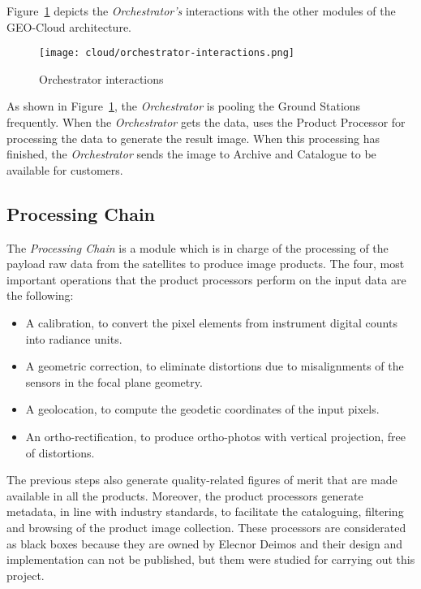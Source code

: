 Figure~\ref{fig:orchestrator-interactions} depicts the \emph{Orchestrator’s} interactions with the other modules of the GEO-Cloud architecture.


\begin{figure}[!h]
\begin{center}
\texttt{[image: cloud/orchestrator-interactions.png]}
\caption{Orchestrator interactions}
\label{fig:orchestrator-interactions}
\end{center}
\end{figure}


As shown in Figure~\ref{fig:orchestrator-interactions}, the \emph{Orchestrator} is
pooling the Ground Stations frequently. When the \emph{Orchestrator} gets the data,
uses the Product Processor for processing the data to generate the result
image. When this processing has finished, the \emph{Orchestrator} sends the image to
Archive and Catalogue to be available for customers.



\subsection{Processing Chain}


The \emph{Processing Chain} is a module which is in charge of the processing of the
payload raw data from the satellites to produce image products. The four, most
important operations that the product processors perform on the input data are
the following:
\begin{itemize}
\item A calibration, to convert the pixel elements from instrument digital counts into radiance units.
\item A geometric correction, to eliminate distortions due to misalignments of the sensors in the focal plane geometry.
\item A geolocation, to compute the geodetic coordinates of the input pixels.
\item An ortho-rectification, to produce ortho-photos with vertical projection, free of distortions.
\end{itemize}

The previous steps also generate quality-related figures of merit that are made
available in all the products. Moreover, the product processors generate
metadata, in line with industry standards, to facilitate the cataloguing,
filtering and browsing of the product image collection. These processors are
considerated as black boxes because they are owned by Elecnor Deimos and their
design and implementation can not be published, but them were studied for
carrying out this project.

